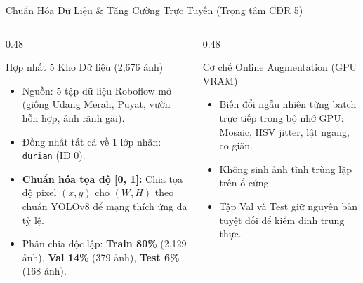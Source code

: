 \documentclass[aspectratio=169, 10pt]{beamer}
\begin{document}
\begin{frame}{Chuẩn Hóa Dữ Liệu \& Tăng Cường Trực Tuyến (Trọng tâm CĐR 5)}
\begin{columns}[T]
\begin{column}{0.48\textwidth}
    \begin{block}{Hợp nhất 5 Kho Dữ liệu (2,676 ảnh)}
    \footnotesize
    \begin{itemize}
        \item Nguồn: 5 tập dữ liệu Roboflow mở (giống Udang Merah, Puyat, vườn hỗn hợp, ảnh rãnh gai).
        \item Đồng nhất tất cả về 1 lớp nhãn: \texttt{durian} (ID 0).
        \item \textbf{Chuẩn hóa tọa độ [0, 1]:} Chia tọa độ pixel $(x, y)$ cho $(W, H)$ theo chuẩn YOLOv8 để mạng thích ứng đa tỷ lệ.
        \item Phân chia độc lập: \textbf{Train 80\%} (2,129 ảnh), \textbf{Val 14\%} (379 ảnh), \textbf{Test 6\%} (168 ảnh).
    \end{itemize}
    \end{block}
\end{column}
\begin{column}{0.48\textwidth}
    \begin{alertblock}{Cơ chế Online Augmentation (GPU VRAM)}
    \footnotesize
    \begin{itemize}
        \item Biến đổi ngẫu nhiên từng batch trực tiếp trong bộ nhớ GPU: Mosaic, HSV jitter, lật ngang, co giãn.
        \item Không sinh ảnh tĩnh trùng lặp trên ổ cứng.
        \item Tập Val và Test giữ nguyên bản tuyệt đối để kiểm định trung thực.
    \end{itemize}
    \end{alertblock}
\end{column}
\end{columns}
\end{frame}
\end{document}
